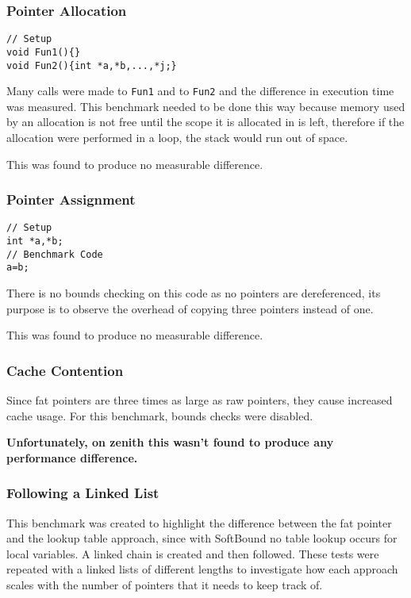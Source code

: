 \subsubsection{Pointer Allocation}

\begin{verbatim}
// Setup
void Fun1(){}
void Fun2(){int *a,*b,...,*j;}
\end{verbatim}

Many calls were made to \verb!Fun1! and to \verb!Fun2! and the difference in execution time was measured.
This benchmark needed to be done this way because memory used by an allocation is not free until the scope it is allocated in is left, therefore if the allocation were performed in a loop, the stack would run out of space.

This was found to produce no measurable difference.

\subsubsection{Pointer Assignment}

\begin{verbatim}
// Setup
int *a,*b;
// Benchmark Code
a=b;
\end{verbatim}

There is no bounds checking on this code as no pointers are dereferenced, its purpose is to observe the overhead of copying three pointers instead of one.

This was found to produce no measurable difference.

\subsubsection{Cache Contention}

Since fat pointers are three times as large as raw pointers, they cause increased cache usage.
For this benchmark, bounds checks were disabled.

\textbf{Unfortunately, on zenith this wasn't found to produce any performance difference.}

\subsubsection{Following a Linked List}

This benchmark was created to highlight the difference between the fat pointer and the lookup table approach, since with SoftBound no table lookup occurs for local variables.
A linked chain is created and then followed.
These tests were repeated with a linked lists of different lengths to investigate how each approach scales with the number of pointers that it needs to keep track of.

